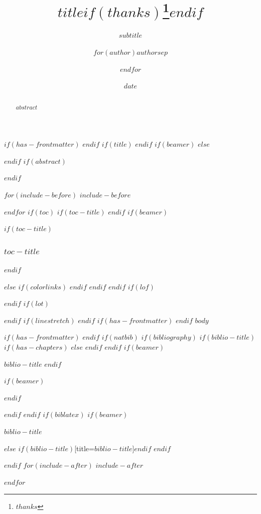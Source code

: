\documentclass[
$if(fontsize)$
  $fontsize$,
$endif$
$if(lang)$
  $babel-lang$,
$endif$
$if(papersize)$
  $papersize$paper,
$endif$
$if(beamer)$
  ignorenonframetext,
$if(handout)$
  handout,
$endif$
$if(aspectratio)$
  aspectratio=$aspectratio$,
$endif$
$endif$
$for(classoption)$
  $classoption$$sep$,
$endfor$
]{$documentclass$}
\title{$title$$if(thanks)$\thanks{$thanks$}$endif$}
\subtitle{$subtitle$}
\author{$for(author)$$author$$sep$ \and $endfor$}
\date{$date$}
\institute{$for(institute)$$institute$$sep$ \and $endfor$}
\newif\ifbibliography
\begin{document}
$if(has-frontmatter)$
\frontmatter
$endif$
$if(title)$
%
$endif$
$if(beamer)$
\frame{\titlepage}
$else$
\maketitle
$endif$
$if(abstract)$
\begin{abstract}
$abstract$
\end{abstract}
$endif$

$for(include-before)$
$include-before$

$endfor$
$if(toc)$
$if(toc-title)$
\renewcommand*\contentsname{$toc-title$}
$endif$
$if(beamer)$
\begin{frame}[allowframebreaks]
$if(toc-title)$
  \frametitle{$toc-title$}
$endif$
  \tableofcontents[hideallsubsections]
\end{frame}
$else$
{
$if(colorlinks)$
\hypersetup{linkcolor=$if(toccolor)$$toccolor$$else$$endif$}
$endif$
\setcounter{tocdepth}{$toc-depth$}
\tableofcontents
}
$endif$
$endif$
$if(lof)$
\listoffigures
$endif$
$if(lot)$
\listoftables
$endif$
$if(linestretch)$
$endif$
$if(has-frontmatter)$
\mainmatter
$endif$
$body$

$if(has-frontmatter)$
\backmatter
$endif$
$if(natbib)$
$if(bibliography)$
$if(biblio-title)$
$if(has-chapters)$
\renewcommand\bibname{$biblio-title$}
$else$
\renewcommand\refname{$biblio-title$}
$endif$
$endif$
$if(beamer)$
\begin{frame}[allowframebreaks]{$biblio-title$}
  \bibliographytrue
$endif$
  
$if(beamer)$
\end{frame}
$endif$

$endif$
$endif$
$if(biblatex)$
$if(beamer)$
\begin{frame}[allowframebreaks]{$biblio-title$}
  \bibliographytrue
  \printbibliography[heading=none]
\end{frame}
$else$
\printbibliography$if(biblio-title)$[title=$biblio-title$]$endif$
$endif$

$endif$
$for(include-after)$
$include-after$

$endfor$
\end{document}
